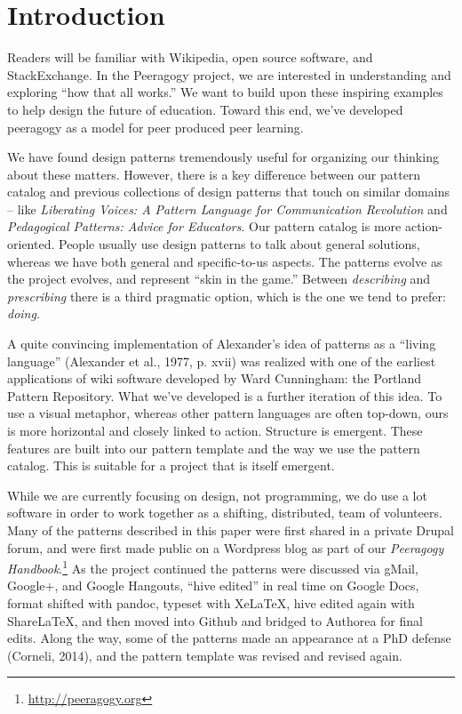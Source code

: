 \section{Introduction}

Readers will be familiar with Wikipedia, open source software, and StackExchange.  In the Peeragogy project, we are interested in understanding and exploring ``how that all works.''    We want to build upon these inspiring examples to help design the future of education.  Toward this end, we've developed peeragogy as a model for peer produced peer learning.

We have found design patterns tremendously useful for organizing our thinking about these matters.  However, there is a key difference between our pattern catalog and previous collections of design patterns that touch on similar domains -- like \emph{Liberating Voices: A Pattern Language for Communication Revolution} and \emph{Pedagogical Patterns: Advice for Educators}.  Our pattern catalog is more action-oriented.  People usually use design patterns to talk about general solutions, whereas we have both general and specific-to-us aspects. The patterns evolve as the project evolves, and represent ``skin in the game.''   Between \emph{describing} and \emph{prescribing} there is a third pragmatic option, which is the one we tend to prefer: \emph{doing}.  

A quite convincing implementation of Alexander’s idea of patterns as a ``living language'' (Alexander et al., 1977, p. xvii) was realized with one of the earliest applications of wiki software developed by Ward Cunningham: the Portland Pattern Repository. What we've developed is a further iteration of this idea. To use a visual metaphor, whereas other pattern languages are often top-down, ours is more horizontal and closely linked to action.  Structure is emergent.  These features are built into our pattern template and the way we use the pattern catalog.  This is suitable for a project that is itself emergent.

While we are currently focusing on design, not programming, we do use a lot software in order to work together as a shifting, distributed, team of volunteers.  Many of the patterns described in this paper were first shared in a private Drupal forum, and were first made public on a Wordpress blog as part of our \emph{Peeragogy Handbook}.\footnote{\url{http://peeragogy.org}}  As the project continued the patterns were discussed via gMail, Google+, and Google Hangouts, ``hive edited'' in real time on Google Docs, format shifted with pandoc, typeset with XeLaTeX, hive edited again with ShareLaTeX, and then moved into Github and bridged to Authorea for final edits.  Along the way, some of the patterns made an appearance at a PhD defense (Corneli, 2014), and the pattern template was revised and revised again.  

